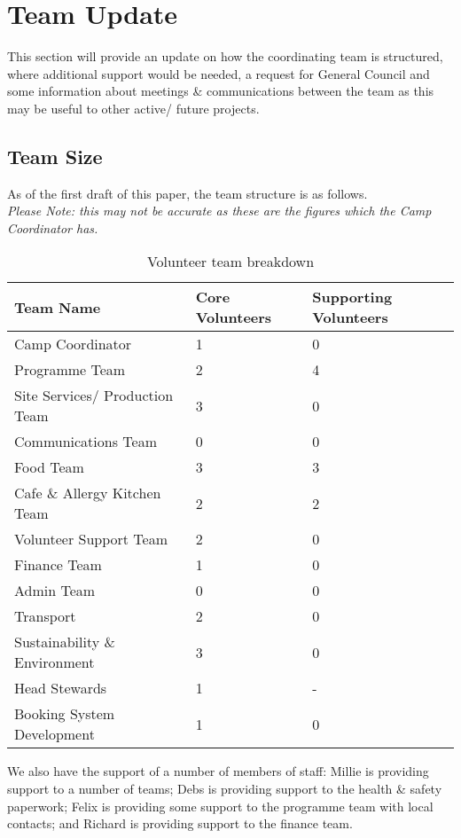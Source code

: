 \chapter{Team Update}
This section will provide an update on how the coordinating team is structured, where additional support would be needed, a request for General Council and some information about meetings \& communications between the team as this may be useful to other active/ future projects.
\section{Team Size}
As of the first draft of this paper, the team structure is as follows.\\
\textit{Please Note: this may not be accurate as these are the figures which the Camp Coordinator has.}
\begin{table}[H]
    \begin{tabularx}{\textwidth}{lXX}
        \textbf{Team Name} & \textbf{Core Volunteers} & \textbf{Supporting Volunteers} \\
        \hline
        \hline
        Camp Coordinator & 1 & 0\\
        \hline
        Programme Team & 2 & 4\\
        \hline
        Site Services/ Production Team & 3 & 0\\
        \hline
        Communications Team & 0 & 0\\
        \hline
        Food Team & 3 & 3 \\
        \hline
        Cafe \& Allergy Kitchen Team & 2 & 2 \\
        \hline
        Volunteer Support Team & 2 & 0\\
        \hline
        Finance Team & 1 & 0\\
        \hline
        Admin Team & 0 & 0\\
        \hline
        Transport & 2 & 0\\
        \hline
        Sustainability \& Environment & 3 & 0\\
        \hline
        Head Stewards & 1 & -\\
        \hline
        Booking System Development & 1 & 0\\
        \hline
    \end{tabularx}
    \caption{Volunteer team breakdown}
\end{table}

We also have the support of a number of members of staff: Millie is providing support to a number of teams; Debs is providing support to the health \& safety paperwork; Felix is providing some support to the programme team with local contacts; and Richard is providing support to the finance team.

